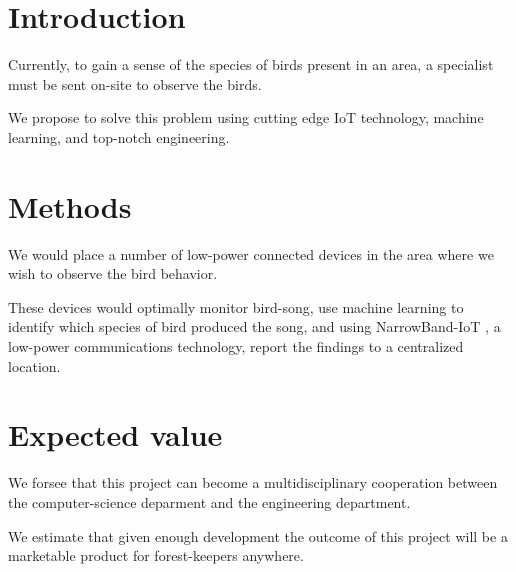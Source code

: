 

\section{Introduction}

    Currently, to gain a sense of the species of birds
    present in an area, a specialist must be sent on-site
    to observe the birds.
    
    We propose to solve this problem using cutting edge IoT
    technology, machine learning, 
    and top-notch engineering. 

\section{Methods}
    We would place a number of low-power connected devices 
    in the area where we wish to observe the bird behavior.

    These devices would optimally monitor bird-song, use
    machine learning to identify which species of bird produced
    the song\cite{614790}, and using NarrowBand-IoT
    \cite{ratasuk2016overview}, a low-power communications 
    technology, report the findings to a centralized location.
     
    
    

\section{Expected value}
    We forsee that this project can become a multidisciplinary
    cooperation between the computer-science deparment and the 
    engineering department. %

    We estimate that given enough development the outcome of 
    this project will be a marketable product for forest-keepers
    anywhere.
